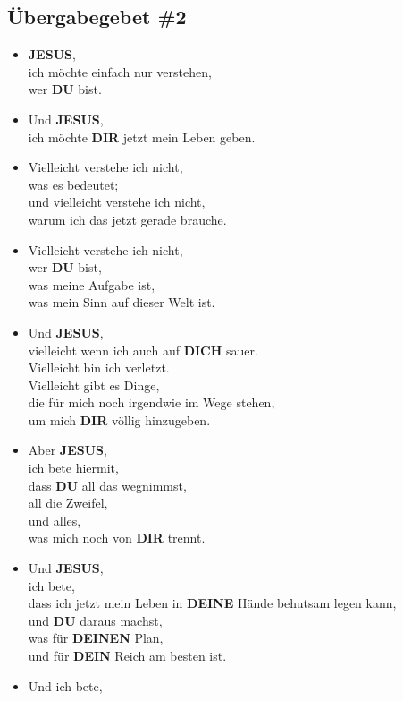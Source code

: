\documentclass[10pt,a5paper]{article}
\newcommand{\Deinen}[0]{\textbf{DEINEN}}
\newcommand{\Deine}[0]{\textbf{DEINE}}
\newcommand{\Dein}[0]{\textbf{DEIN}}
\newcommand{\Dich}[0]{\textbf{DICH}}
\newcommand{\Dir}[0]{\textbf{DIR}}
\newcommand{\Du}[0]{\textbf{DU}}
\newcommand{\Jesus}[0]{\textbf{JESUS}}
\begin{document}
	\subsection{\"Ubergabegebet \#2}
		\begin{itemize}[nosep]
			\item	{\Jesus},
			\\		ich m\"ochte einfach nur verstehen,
			\\		wer {\Du} bist.
			\item	Und {\Jesus},
			\\		ich m\"ochte {\Dir} jetzt mein Leben geben.
			\item	Vielleicht verstehe ich nicht,
			\\		was es bedeutet;
			\\		und vielleicht verstehe ich nicht,
			\\		warum ich das jetzt gerade brauche.
			\item	Vielleicht verstehe ich nicht,
			\\		wer {\Du} bist,
			\\		was meine Aufgabe ist,
			\\		was mein Sinn auf dieser Welt ist.
			\item	Und {\Jesus},
			\\		vielleicht wenn ich auch auf {\Dich} sauer.
			\\		Vielleicht bin ich verletzt.
			\\		Vielleicht gibt es Dinge,
			\\		die f\"ur mich noch irgendwie im Wege stehen,
			\\		um mich {\Dir} v\"ollig hinzugeben.
			\item	Aber {\Jesus},
			\\		ich bete hiermit,
			\\		dass {\Du} all das wegnimmst,
			\\		all die Zweifel,
			\\		und alles,
			\\		was mich noch von {\Dir} trennt.
			\item	Und {\Jesus},
			\\		ich bete,
			\\		dass ich jetzt mein Leben in {\Deine} H\"ande behutsam legen kann,
			\\		und {\Du} daraus machst,
			\\		was f\"ur {\Deinen} Plan,
			\\		und f\"ur {\Dein} Reich am besten ist.
			\item	Und ich bete,

\end{itemize}
\end{document}

